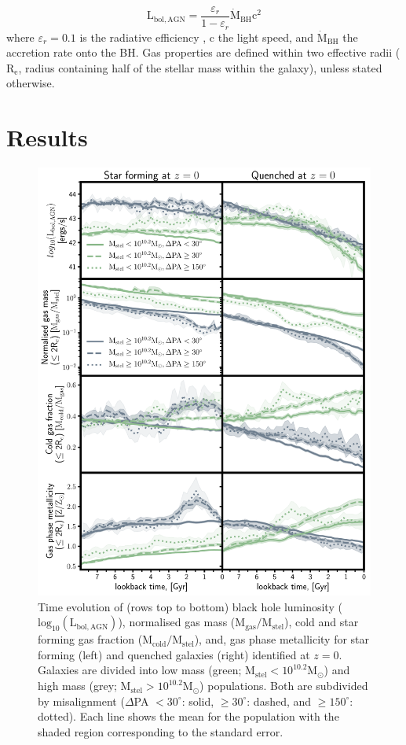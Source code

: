 \documentclass[fleqn,usenatbib]{mnras}
\begin{document}
\begin{equation}
\mathrm{L_{bol, AGN}} = \frac{\varepsilon_r}{1 - \varepsilon_r} \dot{\mathrm{M}}_{\mathrm{BH}} \mathrm{c^2}
\end{equation}
where $\varepsilon_r=0.1$ is the radiative efficiency \citep[see discussion in][]{habouzit2019}, c the light speed, and $\dot{\mathrm{M}}_{\mathrm{BH}}$ the accretion rate onto the BH. Gas properties are defined within two effective radii ($\mathrm{R_{e}}$, radius containing half of the stellar mass within the galaxy), unless stated otherwise.

\section{Results} \label{sec:results}
\begin{figure}
	\includegraphics[width=\linewidth]{overall_population/time_evo_letter_without_BH_props.pdf}
    \caption{Time evolution of (rows top to bottom) black hole luminosity ($\mathrm{log_{10}(L_{bol, AGN})}$), normalised gas mass ($\mathrm{M_{gas}/M_{stel}}$), cold and star forming gas fraction ($\mathrm{M_{cold}/M_{stel}}$), and, gas phase metallicity for star forming (left) and quenched galaxies (right) identified at $z=0$. Galaxies are divided into low mass (green; $\mathrm{M_{stel} < 10^{10.2}M_{\odot}}$) and high mass (grey; $\mathrm{M_{stel} > 10^{10.2}M_{\odot}}$) populations. Both are subdivided by misalignment ($\Delta$PA $< 30^{\circ}$: solid, $\geq 30^{\circ}$: dashed, and  $\geq 150^{\circ}$: dotted). Each line shows the mean for the population with the shaded region corresponding to the standard error.
}
\end{figure}
\end{document}
